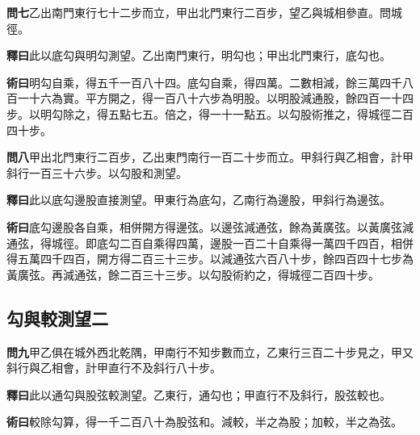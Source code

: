 \documentclass[12pt,a4paper]{article}
\newcommand{\Section}[1]{\subsection*{#1}}
\begin{document}
\vspace{0.5em}

\noindent\textbf{問七}\quad 乙出南門東行七十二步而立，甲出北門東行二百步，望乙與城相參直。問城徑。

\vspace{0.3em}

\noindent\textbf{釋曰}\quad 此以底勾與明勾測望。乙出南門東行，明勾也；甲出北門東行，底勾也。

\vspace{0.3em}

\noindent\textbf{術曰}\quad 明勾自乘，得五千一百八十四。底勾自乘，得四萬。二數相減，餘三萬四千八百一十六為實。平方開之，得一百八十六步為明股。以明股減通股，餘四百一十四步。以明勾除之，得五點七五。倍之，得一十一點五。以勾股術推之，得城徑二百四十步。

\vspace{0.5em}

\noindent\textbf{問八}\quad 甲出北門東行二百步，乙出東門南行一百二十步而立。甲斜行與乙相會，計甲斜行一百三十六步。以勾股和測望。

\vspace{0.3em}

\noindent\textbf{釋曰}\quad 此以底勾邊股直接測望。甲東行為底勾，乙南行為邊股，甲斜行為邊弦。

\vspace{0.3em}

\noindent\textbf{術曰}\quad 底勾邊股各自乘，相併開方得邊弦。以邊弦減通弦，餘為黃廣弦。以黃廣弦減通弦，得城徑。即底勾二百自乘得四萬，邊股一百二十自乘得一萬四千四百，相併得五萬四千四百，開方得二百三十三步。以減通弦六百八十步，餘四百四十七步為黃廣弦。再減通弦，餘二百三十三步。以勾股術約之，得城徑二百四十步。

\Section{勾與較測望二}

\noindent\textbf{問九}\quad 甲乙俱在城外西北乾隅，甲南行不知步數而立，乙東行三百二十步見之，甲又斜行與乙相會，計甲直行不及斜行八十步。

\vspace{0.3em}

\noindent\textbf{釋曰}\quad 此以通勾與股弦較測望。乙東行，通勾也；甲直行不及斜行，股弦較也。

\vspace{0.3em}

\noindent\textbf{術曰}\quad 較除勾算，得一千二百八十為股弦和。減較，半之為股；加較，半之為弦。
\end{document}
